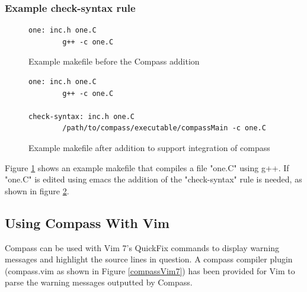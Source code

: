 \subsubsection{Example check-syntax rule}


\begin{figure}
\begin{verbatim}
one: inc.h one.C
        g++ -c one.C
\end{verbatim}
\caption{Example makefile before the Compass addition  }
\label{beforeProjectCheckRule}
\end{figure}


\begin{figure}
\begin{verbatim}
one: inc.h one.C
        g++ -c one.C
		
check-syntax: inc.h one.C
        /path/to/compass/executable/compassMain -c one.C
\end{verbatim}
\caption{Example makefile after addition to support integration of compass  }
\label{projectCheckRule}
\end{figure}


Figure \ref{beforeProjectCheckRule} shows an example makefile that compiles a file
"one.C" using g++. If "one.C" is edited using emacs the addition of the "check-syntax"
rule is needed, as shown in figure \ref{projectCheckRule}.

\subsection {Using Compass With Vim}
Compass can be used with Vim 7's QuickFix commands to display warning
messages and highlight the source lines in question. A compass compiler
plugin (compass.vim as shown in Figure \ref{compassVim7})  has
been provided for Vim to parse the warning messages outputted by Compass.

